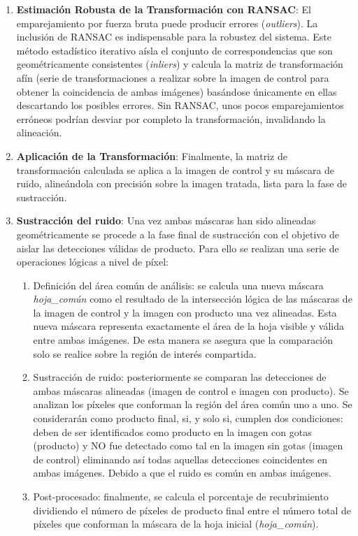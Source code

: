 \begin{enumerate}
    \item \textbf{Estimación Robusta de la Transformación con RANSAC}: El emparejamiento por fuerza bruta puede producir errores (\textit{outliers}). La inclusión de RANSAC\cite{VINAYA2015174} es indispensable para la robustez del sistema. Este método estadístico iterativo aísla el conjunto de correspondencias que son geométricamente consistentes (\textit{inliers}) y calcula la matriz de transformación afín (serie de transformaciones a realizar sobre la imagen de control para obtener la coincidencia de ambas imágenes) basándose únicamente en ellas descartando los posibles errores. Sin RANSAC, unos pocos emparejamientos erróneos podrían desviar por completo la transformación, invalidando la alineación.

    \item \textbf{Aplicación de la Transformación}: Finalmente, la matriz de transformación calculada se aplica a la imagen de control y su máscara de ruido, alineándola con precisión sobre la imagen tratada, lista para la fase de sustracción.

    \item \textbf{Sustracción del ruido}: Una vez ambas máscaras han sido alineadas geométricamente se procede a la fase final de sustracción con el objetivo de aislar las detecciones válidas de producto. Para ello se realizan una serie de operaciones lógicas a nivel de píxel:

\begin{enumerate}
    \item Definición del área común de análisis: se calcula una nueva máscara \textit{hoja\_común} como el resultado de la intersección lógica de las máscaras de la imagen de control y la imagen con producto una vez alineadas. Esta nueva máscara representa exactamente el área de la hoja visible y válida entre ambas imágenes. De esta manera se asegura que la comparación solo se realice sobre la región de interés compartida.

    \item Sustracción de ruido: posteriormente se comparan las detecciones de ambas máscaras alineadas (imagen de control e imagen con producto). Se analizan los píxeles que conforman la región del área común uno a uno. Se considerarán como producto final, si, y solo si, cumplen dos condiciones: deben de ser identificados como producto en la imagen con gotas (producto) y NO fue detectado como tal en la imagen sin gotas (imagen de control) eliminando así todas aquellas detecciones coincidentes en ambas imágenes. Debido a que el ruido es común en ambas imágenes.

    \item Post-procesado: finalmente, se calcula el porcentaje de recubrimiento dividiendo el número de píxeles de producto final entre el número total de píxeles que conforman la máscara de la hoja inicial (\textit{hoja\_común}). 

\end{enumerate}


\end{enumerate}
